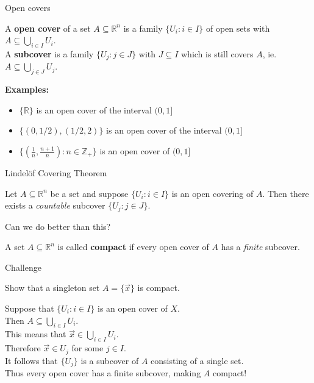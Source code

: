 \documentclass{beamer}
\begin{document}
\begin{frame}{Open covers}
\begin{defn}
A \textbf{open cover} of a set $A\subseteq\mathbb{R}^n$ is a family $\{U_i: i\in I\}$ of open sets with $A\subseteq \bigcup_{i\in I} U_i$.\\\pause
A \textbf{subcover} is a family $\{U_j: j\in J\}$ with $J\subseteq I$ which is still covers $A$, ie. $A\subseteq \bigcup_{j\in J} U_j$.
\end{defn}
\pause
\textbf{Examples:}
\begin{itemize}
\pause
\item $\{\mathbb{R}\}$ is an open cover of the interval $(0,1]$
\pause
\item $\{(0,1/2), (1/2, 2)\}$ is an open cover of the interval $(0,1]$
\pause
\item $\{(\frac{1}{n},\frac{n+1}{n}): n\in\mathbb{Z}_+\}$ is an open cover of $(0,1]$
\end{itemize}
\end{frame}

\begin{frame}{Lindel\"{o}f Covering Theorem}
\begin{thm}
Let $A\subseteq\mathbb{R}^n$ be a set and suppose $\{U_i: i\in I\}$ is an open covering of $A$.
Then there exists a \emph{countable} subcover $\{U_j: j\in J\}.$
\end{thm}
\pause
\begin{quest}
Can we do better than this?
\end{quest}
\pause
\begin{defn}
A set $A\subseteq\mathbb{R}^n$ is called \textbf{compact} if every open cover of $A$ has a \emph{finite} subcover.
\end{defn}
\end{frame}

\begin{frame}{Challenge}
\begin{prob}
Show that a singleton set $A=\{\vec x\}$ is compact.
\end{prob}
\begin{soln}
Suppose that $\{U_i: i\in I\}$ is an open cover of $X$.\\
Then $A\subseteq \bigcup_{i\in I} U_i$.\\
This means that $\vec x\in\bigcup_{i\in I} U_i$.\\
Therefore $\vec x\in U_j$ for some $j\in I$.\\
It follows that $\{U_j\}$ is a subcover of $A$ consisting of a single set.\\
Thus every open cover has a finite subcover, making $A$ compact!
\end{soln}
\end{frame}
\end{document}
